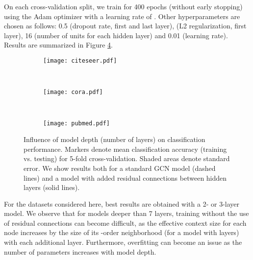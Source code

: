 \documentclass{article} \usepackage{iclr2017_conference,times}
\makeatletter
\newcommand*{\vs}{vs.\@\xspace}
\makeatother
\begin{document}
On each cross-validation split, we train for 400 epochs (without early stopping) using the Adam optimizer \citep{kingma2014adam} with a learning rate of . Other hyperparameters are chosen as follows: 0.5 (dropout rate, first and last layer),  (L2 regularization, first layer), 16 (number of units for each hidden layer) and 0.01 (learning rate). Results are summarized in Figure \ref{fig:model-depth}.

\begin{figure}[htbp]
\centering
\begin{subfigure}[b]{0.33\textwidth}
    \centering
    \texttt{[image: citeseer.pdf]}
    \label{fig:model-depth-a}
\end{subfigure}~
\begin{subfigure}[b]{0.33\textwidth}
    \centering
    \texttt{[image: cora.pdf]}
    \label{fig:model-depth-b}
\end{subfigure}~
\begin{subfigure}[b]{0.33\textwidth}
    \centering
    \texttt{[image: pubmed.pdf]}
    \label{fig:model-depth-c}
\end{subfigure}\vspace{-1em}
\caption{Influence of model depth (number of layers) on classification performance. Markers denote mean classification accuracy (training \vs testing) for 5-fold cross-validation. Shaded areas denote standard error. We show results both for a standard GCN model (dashed lines) and a model with added residual connections \citep{he2015deep} between hidden layers (solid lines).}
\label{fig:model-depth}
\end{figure}

For the datasets considered here, best results are obtained with a 2- or 3-layer model. We observe that for models deeper than 7 layers, training without the use of residual connections can become difficult, as the effective context size for each node increases by the size of its -order neighborhood (for a model with  layers) with each additional layer. Furthermore, overfitting can become an issue as the number of parameters increases with model depth. 
\end{document}
